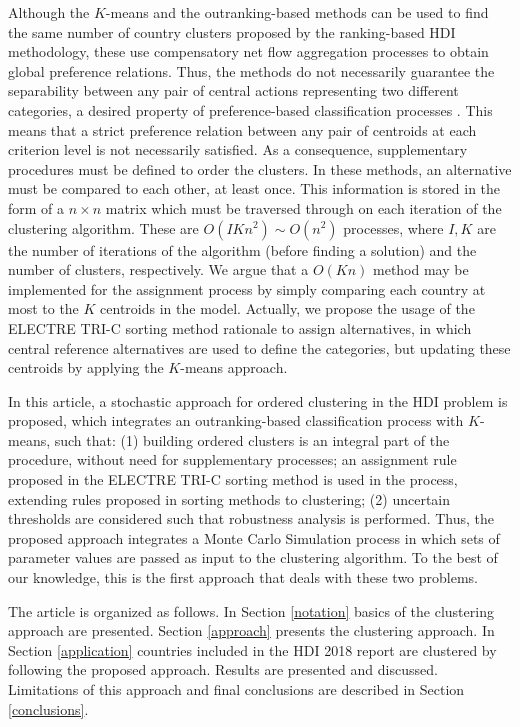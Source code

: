 \documentclass[]{elsarticle}
\theoremstyle{definition}
\begin{document}
Although the $K$-means and the outranking-based methods can be used to find the same number of country clusters proposed by the ranking-based HDI methodology, these use compensatory net flow aggregation processes to obtain global preference relations. Thus, the methods do not necessarily guarantee the separability between any pair of central actions representing two different categories, a desired property of preference-based classification processes \citep{roy2012}. This means that a strict preference relation between any pair of centroids at each criterion level is not necessarily satisfied. As a consequence, supplementary procedures must be defined to order the clusters.  In these methods,  an alternative must be compared to each other, at least once. This information is stored in the form of a $n \times n$ matrix which must be traversed through on each iteration of the clustering algorithm. These are $O(IKn^2) \sim O(n^2)$ processes, where $I, K$ are the number of iterations of the algorithm (before finding a solution) and the number of clusters, respectively. We argue that a $O(Kn)$ method may be implemented for the assignment process by simply comparing each country at most to the $K$ centroids in the model.  Actually, we propose the usage of the ELECTRE TRI-C sorting method rationale to assign alternatives, in which central reference alternatives are used to define the categories, but updating these centroids by applying the $K$-means approach.

In this article, a stochastic approach for ordered clustering in the HDI problem is proposed, which integrates an outranking-based classification process with $K$-means, such that:  (1) building ordered clusters is an integral part of the procedure, without need for supplementary processes; an assignment rule proposed in the ELECTRE TRI-C sorting method \citep{almeida2008,Almeida2012} is used in the process, extending rules proposed in sorting methods to clustering; (2) uncertain thresholds are considered such that robustness analysis is performed. Thus, the proposed approach integrates  a Monte Carlo Simulation process in which sets of  parameter values are passed as input to the clustering algorithm. To the best of our knowledge, this is the first approach that deals with these two problems.

The article is organized as follows. In Section \ref{notation} basics of the clustering approach are presented. Section \ref{approach} presents the clustering approach. In Section \ref{application}  countries included in the HDI 2018 report are clustered by following the proposed approach.  Results are presented and discussed.  Limitations of this approach and final conclusions are described in Section \ref{conclusions}.
\end{document}
